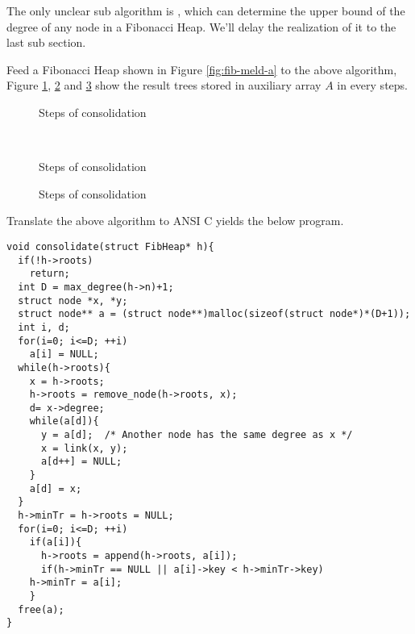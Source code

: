 \documentclass{article}
\begin{document}
The only unclear sub algorithm is , which can determine
the upper bound of the degree of any node in a Fibonacci Heap. We'll delay
the realization of it to the last sub section.

Feed a Fibonacci Heap shown in Figure \ref{fig:fib-meld-a} to the above algorithm,
Figure \ref{fig:fib-cons-a}, \ref{fig:fib-cons-b} and \ref{fig:fib-cons-c}
show the result trees stored in auxiliary array $A$ in every steps.

\begin{figure}[htbp]
  \centering
  \caption{Steps of consolidation} \label{fig:fib-cons-a}
\end{figure}

\begin{figure}[htbp]
  \centering
   \\
  \caption{Steps of consolidation} \label{fig:fib-cons-b}
\end{figure}

\begin{figure}[htbp]
  \centering
  \caption{Steps of consolidation} \label{fig:fib-cons-c}
\end{figure}


Translate the above algorithm to ANSI C yields the below program.

\lstset{language = C}
\begin{lstlisting}
void consolidate(struct FibHeap* h){
  if(!h->roots)
    return;
  int D = max_degree(h->n)+1;
  struct node *x, *y;
  struct node** a = (struct node**)malloc(sizeof(struct node*)*(D+1));
  int i, d;
  for(i=0; i<=D; ++i)
    a[i] = NULL;
  while(h->roots){
    x = h->roots;
    h->roots = remove_node(h->roots, x);
    d= x->degree;
    while(a[d]){
      y = a[d];  /* Another node has the same degree as x */
      x = link(x, y);
      a[d++] = NULL;
    }
    a[d] = x;
  }
  h->minTr = h->roots = NULL;
  for(i=0; i<=D; ++i)
    if(a[i]){
      h->roots = append(h->roots, a[i]);
      if(h->minTr == NULL || a[i]->key < h->minTr->key)
	h->minTr = a[i];
    }
  free(a);
}
\end{lstlisting}
\end{document}

